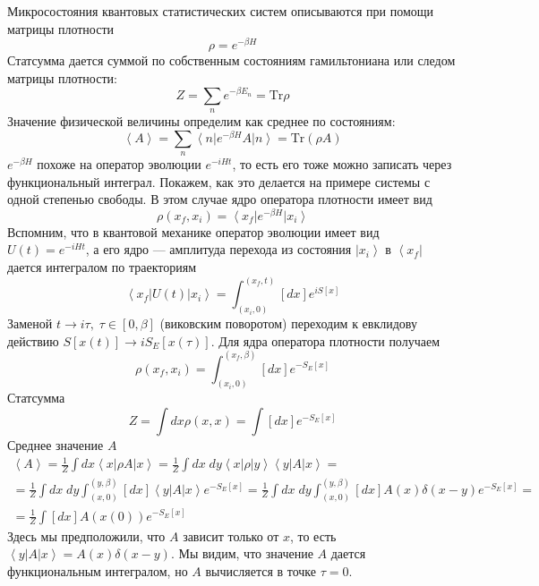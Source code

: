 \documentclass[a4paper,12pt]{article} \usepackage[utf8x]{inputenc} \usepackage[russian]{babel}
\theoremstyle{definition} \newtheorem{corollary}{Corollary}[theorem] \theoremstyle{definition}
\begin{document}
Микросостояния квантовых статистических систем описываются при помощи матрицы плотности
\begin{equation}
  \label{eq:19} \rho=e^{-\beta H}
\end{equation} Статсумма дается суммой по собственным состояниям гамильтониана или следом матрицы
плотности:
\begin{equation}
  \label{eq:20} Z=\sum_n e^{-\beta E_n}=\mathrm{Tr} \rho
\end{equation} Значение физической величины определим как среднее по состояниям:
\begin{equation}
  \label{eq:21} \left< A\right>=\sum_n \left< n\right| e^{-\beta H}A\left| n
\right>=\mathrm{Tr}(\rho A)
\end{equation} $e^{-\beta H}$ похоже на оператор эволюции $e^{-i H t}$, то есть его тоже можно
записать через функциональный интеграл. Покажем, как это делается на примере системы с одной
степенью свободы. В этом случае ядро оператора плотности имеет вид
\begin{equation}
  \label{eq:22} \rho(x_f,x_i)=\left<x_f\right|e^{-\beta H} \left|x_i\right>
\end{equation} Вспомним, что в квантовой механике оператор эволюции имеет вид $U(t)=e^{-i H t}$, а
его ядро --- амплитуда перехода из состояния $\left|x_i\right>$ в $\left<x_f\right|$ дается
интегралом по траекториям
\begin{equation}
  \label{eq:23} \left<x_f\right| U(t)\left| x_i\right>=\int_{(x_i,0)}^{(x_f,t)} [dx] e^{i S[x]}
\end{equation} Заменой $t\to i\tau, \; \tau\in [0,\beta]$ (виковским поворотом) переходим к
евклидову действию $S[x(t)]\to iS_E[x(\tau)]$. Для ядра оператора плотности получаем
\begin{equation}
  \label{eq:24} \rho(x_f,x_i)=\int_{(x_i,0)}^{(x_f,\beta)} [dx] e^{-S_E[x]}
\end{equation} Статсумма
\begin{equation}
  \label{eq:25} Z=\int dx \rho(x,x)=\int [dx] e^{-S_E[x]}
\end{equation} Среднее значение $A$
\begin{equation}
  \label{eq:26}
  \begin{array}{l} \left<A\right>=\frac{1}{Z}\int dx \left<x\right|\rho
A\left|x\right>=\frac{1}{Z}\int dx\; dy
\left<x\right|\rho\left|y\right>\left<y\right|A\left|x\right>= \\ =\frac{1}{Z}\int dx\; dy
\int_{(x,0)}^{(y,\beta)} [dx] \left<y\right| A\left| x\right> e^{-S_E[x]}=\frac{1}{Z}\int dx\;
dy\int_{(x,0)}^{(y,\beta)} [dx] A(x) \delta(x-y) e^{-S_E[x]}=\\ =\frac{1}{Z}\int [dx]
A(x(0))e^{-S_E[x]}
  \end{array}
\end{equation} Здесь мы предположили, что $A$ зависит только от $x$, то есть $\left<y\right|
A\left|x\right>=A(x)\delta(x-y)$. Мы видим, что значение $A$ дается функциональным интегралом, но
$A$ вычисляется в точке $\tau=0$.
\end{document}
